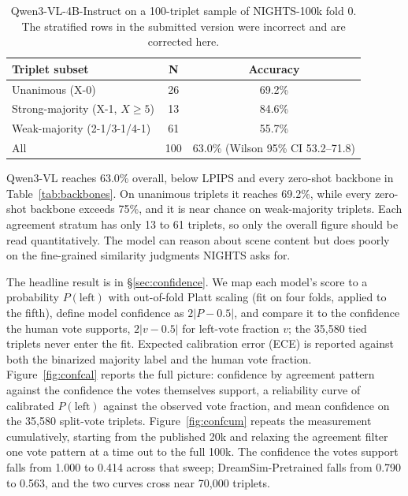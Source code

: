\begin{table}[!ht]
\caption{Qwen3-VL-4B-Instruct on a 100-triplet sample of NIGHTS-100k fold 0. The stratified rows in the submitted version were incorrect and are corrected here.}
\label{tab:qwen}
\centering
\small
\begin{tabular}{lcc}
\toprule
Triplet subset & N & Accuracy \\
\midrule
Unanimous (X-0)            & 26 & 69.2\% \\
Strong-majority (X-1, $X{\geq}5$) & 13 & 84.6\% \\
Weak-majority (2-1/3-1/4-1) & 61 & 55.7\% \\
\midrule
All                        & 100 & 63.0\% (Wilson 95\% CI 53.2--71.8) \\
\bottomrule
\end{tabular}
\end{table}

Qwen3-VL reaches 63.0\% overall, below LPIPS and every zero-shot backbone in Table~\ref{tab:backbones}. On unanimous triplets it reaches 69.2\%, while every zero-shot backbone exceeds 75\%, and it is near chance on weak-majority triplets. Each agreement stratum has only 13 to 61 triplets, so only the overall figure should be read quantitatively. The model can reason about scene content but does poorly on the fine-grained similarity judgments NIGHTS asks for.

\clearpage
{}
\vspace{1em}

The headline result is in \S\ref{sec:confidence}. We map each model's score to a probability $P(\text{left})$ with out-of-fold Platt scaling (fit on four folds, applied to the fifth), define model confidence as $2|P-0.5|$, and compare it to the confidence the human vote supports, $2|v-0.5|$ for left-vote fraction $v$; the 35{,}580 tied triplets never enter the fit. Expected calibration error (ECE) is reported against both the binarized majority label and the human vote fraction. Figure~\ref{fig:confcal} reports the full picture: confidence by agreement pattern against the confidence the votes themselves support, a reliability curve of calibrated $P(\text{left})$ against the observed vote fraction, and mean confidence on the 35{,}580 split-vote triplets. Figure~\ref{fig:confcum} repeats the measurement cumulatively, starting from the published 20k and relaxing the agreement filter one vote pattern at a time out to the full 100k. The confidence the votes support falls from 1.000 to 0.414 across that sweep; DreamSim-Pretrained falls from 0.790 to 0.563, and the two curves cross near 70{,}000 triplets.

